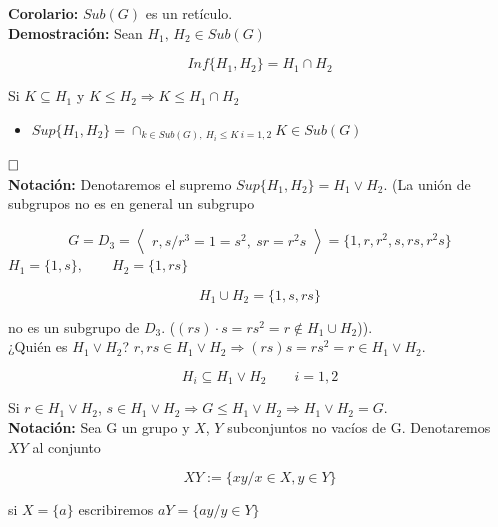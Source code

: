 \documentclass{article}
\begin{document}
\textbf{Corolario:} $Sub(G)$ es un retículo. \\

\textbf{Demostración:} Sean $H_1,\,H_2\in Sub(G)$

\begin{equation*}
Inf\{H_1,H_2\}=H_1\cap H_2
\end{equation*}

Si $K \subseteq H_1$ y $K \leq H_2 \Rightarrow K \leq H_1 \cap H_2$

\begin{itemize}
\item $Sup\{H_1,H_2\}=\cap_{k \in Sub(G),\:H_i\leq K\: i=1,2} K \in Sub(G)$
\end{itemize}

$\hfill\square$ \\

\textbf{Notación:} Denotaremos el supremo $Sup\{H_1,H_2\}=H_1\lor H_2$. (La unión de subgrupos no es en general un subgrupo 

\begin{equation*}
G=D_3=\left\langle \begin{array}{c}
r,s/r^3=1=s^2,\: sr=r^2s
\end{array} \right\rangle 
=\{1,r,r^2,s,rs,r^2s\}
\end{equation*}
$H_1=\{1,s\},\qquad H_2=\{1,rs\}$ 

\begin{equation*}
H_1\cup H_2=\{1,s,rs\}
\end{equation*}

no es un subgrupo de $D_3$. ($(rs)\cdot s=rs^2=r \notin H_1\cup H_2$)). \\

¿Quién es $H_1\lor H_2$? $r,rs\in H_1\lor H_2 \Rightarrow (rs)s=rs^2=r\in H_1\lor H_2$. 

\begin{equation*}
H_i\subseteq H_1\lor H_2 \qquad i=1,2
\end{equation*}

Si $r \in H_1\lor H_2$, $s\in H_1\lor H_2 \Rightarrow G \leq H_1\lor H_2 \Rightarrow H_1\lor H_2 =G$. \\

\textbf{Notación:} Sea G un grupo y $X$, $Y$ subconjuntos no vacíos de G. Denotaremos $XY$ al conjunto

\begin{equation*}
XY:=\{xy/x\in X, y \in Y\}
\end{equation*}

si $X=\{a\}$ escribiremos $aY=\{ay/y\in Y\}$
\end{document}
